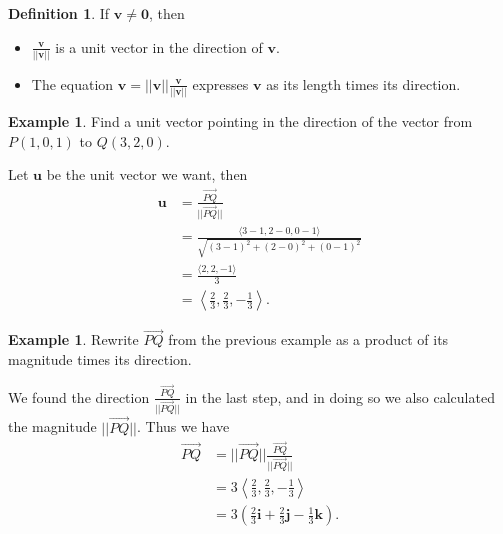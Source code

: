 \documentclass[12pt, letter]{article}
\theoremstyle{plain}
\numberwithin{theorem}{section}
\theoremstyle{definition}
\newtheorem{definition}[theorem]{Definition}
\newtheorem{example}[theorem]{Example}
\begin{document}
\bigskip

\hrulefill

\bigskip

\begin{definition}
If $\bm{v} \neq \bm{0}$, then
\begin{itemize}
\item $\frac{\bm{v}}{||\bm{v}||}$ is a unit vector in the direction of $\bm{v}$.
\item The equation $\bm{v} = ||\bm{v}|| \frac{\bm{v}}{||\bm{v}||}$ expresses $\bm{v}$ as its length times its direction.
\end{itemize}
\end{definition}

\bigskip

\hrulefill

\bigskip

\begin{example}
Find a unit vector pointing in the direction of the vector from $P(1,0,1)$ to $Q(3,2,0)$.\\

\smallskip

Let $\bm{u}$ be the unit vector we want, then
\begin{align*}
\bm{u} &= \frac{\vec{PQ}}{||\vec{PQ}||}\\
&= \frac{\langle 3-1, 2-0, 0-1 \rangle}{\sqrt{(3-1)^2+(2-0)^2+(0-1)^2}}\\
&= \frac{\langle 2, 2, -1 \rangle} {3}\\
&= \left\langle \frac{2}{3}, \frac{2}{3}, -\frac{1}{3} \right\rangle.
\end{align*}
\end{example}

\bigskip

\hrulefill

\bigskip

\begin{example}
Rewrite $\vec{PQ}$ from the previous example as a product of its magnitude times its direction.\\

\smallskip

We found the direction $\frac{\vec{PQ}}{||\vec{PQ}||}$ in the last step, and in doing so we also calculated the magnitude $||\vec{PQ}||$. Thus we have
\begin{align*}
\vec{PQ} &= ||\vec{PQ}|| \frac{\vec{PQ}}{||\vec{PQ}||}\\
&= 3\left\langle \frac{2}{3}, \frac{2}{3}, -\frac{1}{3} \right\rangle\\
&= 3\left( \frac{2}{3}\bm{i}+ \frac{2}{3}\bm{j} -\frac{1}{3}\bm{k} \right).
\end{align*}
\end{example}
\end{document}
